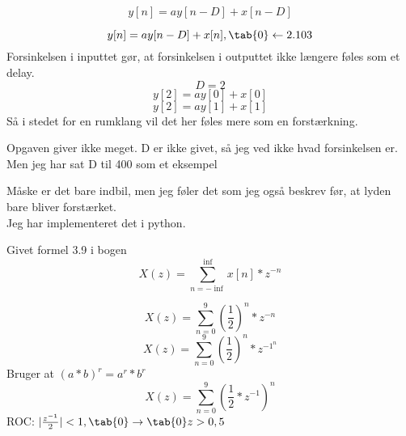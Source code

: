 \begin{Opgaver}
\begin{kapitel}
        \begin{Opgave}
            \[y[n] = ay[n-D] + x[n - D]\]
            \begin{UnderOpgave}
                \[y[n] = ay[n-D] + x[n],\tab{0} \leftarrow 2.103\]
                Forsinkelsen i inputtet gør, at forsinkelsen i outputtet ikke længere føles som et delay. 
                \[D = 2\]
                \[y[2] = ay[0] + x[0]\]
                \[y[2] = ay[1] + x[1]\]\clearpage
                Så i stedet for en rumklang vil det her føles mere som en forstærkning. 
            \end{UnderOpgave}
            \begin{UnderOpgave}\end{UnderOpgave}
            \begin{UnderOpgave}[Beregn og plot for a = 0.7]
                Opgaven giver ikke meget. D er ikke givet, så jeg ved ikke hvad forsinkelsen er. 
                Men jeg har sat D til 400 som et eksempel
            \end{UnderOpgave}
            \begin{UnderOpgave}
                Måske er det bare indbil, men jeg føler det som jeg også beskrev før, at lyden bare bliver forstærket. \\
                Jeg har implementeret det i python.                
            \end{UnderOpgave}
        \end{Opgave}
    \end{kapitel}
    \begin{kapitel}[Z transformation]
        \begin{Opgave}
            Givet formel 3.9 i bogen
            \[X(z) = \sum_{n=-\inf}^{\inf}{x[n]*z^{-n}}\]
            \begin{UnderOpgave}[\text{$x[n] = (\frac{1}{2})^n * (u[n] - u[n - 10])$}]
                \[X(z) = \sum_{n=0}^{9}{(\frac{1}{2})^n * z^{-n}}\]
                \[X(z) = \sum_{n=0}^{9}{(\frac{1}{2})^n * z^{-1^{n}}}\]
                Bruger at $(a*b)^r = a^r * b^r$
                \[X(z) = \sum_{n=0}^{9}{(\frac{1}{2} * z^{-1})^n}\]
                ROC: $|\frac{z^{-1}}{2}| < 1,\tab{0}\rightarrow\tab{0} z > 0,5$

\end{UnderOpgave}
\end{Opgave}
\end{kapitel}
\end{Opgaver}
